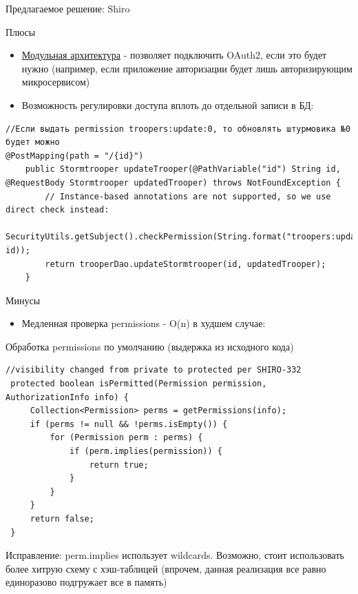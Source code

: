 \documentclass[presentation]{beamer}
\begin{document}
\begin{frame}[label={sec:org90289dd},fragile]{Предлагаемое решение: Shiro}
 \begin{block}{Плюсы}
\begin{itemize}
\item \hyperlink{sec:org9c63c5e}{Модульная архитектура} - позволяет подключить OAuth2, если это будет нужно (например, если приложение авторизации будет лишь авторизирующим микросервисом)
\item Возможность регулировки доступа вплоть до отдельной записи в БД:
\end{itemize}
\begin{verbatim}
//Если выдать permission troopers:update:0, то обновлять штурмовика №0 будет можно
@PostMapping(path = "/{id}")
    public Stormtrooper updateTrooper(@PathVariable("id") String id, @RequestBody Stormtrooper updatedTrooper) throws NotFoundException {
        // Instance-based annotations are not supported, so we use direct check instead:
        SecurityUtils.getSubject().checkPermission(String.format("troopers:update:%s", id));
        return trooperDao.updateStormtrooper(id, updatedTrooper);
    }

\end{verbatim}
\end{block}

\begin{block}{Минусы}
\begin{itemize}
\item Медленная проверка permissions - O(n) в худшем случае:
\end{itemize}

\begin{block}{Обработка permissions по умолчанию (выдержка из исходного кода)}
\begin{verbatim}
//visibility changed from private to protected per SHIRO-332
 protected boolean isPermitted(Permission permission, AuthorizationInfo info) {
     Collection<Permission> perms = getPermissions(info);
     if (perms != null && !perms.isEmpty()) {
         for (Permission perm : perms) {
             if (perm.implies(permission)) {
                 return true;
             }
         }
     }
     return false;
 }
\end{verbatim}


Исправление: perm.implies использует wildcards. Возможно, стоит использовать более хитрую схему с хэш-таблицей (впрочем, данная реализация все равно единоразово подгружает все в память)


\end{block}
\end{block}
\end{frame}
\end{document}
